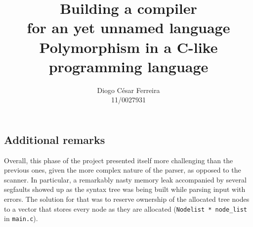 \documentclass[12pt]{article}
\begin{document}
\title{Building a compiler\\\Large for an yet unnamed language\\\small Polymorphism in a C-like programming language}

\author{Diogo César Ferreira\\11/0027931}
\maketitle


 
\clearpage







\subsection{Additional remarks}
Overall, this phase of the project presented itself more challenging than the previous ones,
given the more complex nature of the parser, as opposed to the scanner. In particular, a
remarkably nasty memory leak accompanied by several segfaults showed up as the
syntax tree was being built while parsing input with errors. The solution for that was to
reserve ownership of the allocated tree nodes to a vector that stores every node as they
are allocated (\texttt{Nodelist * node\_list} in \texttt{main.c}).

\printbibliography
\end{document}
